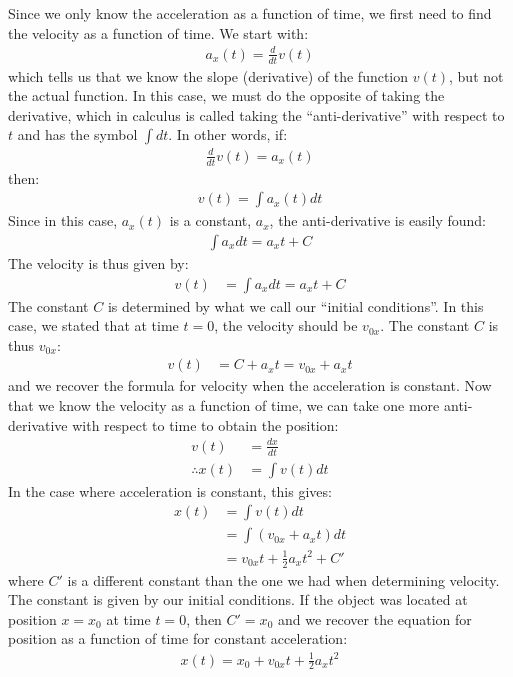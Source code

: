 Since we only know the acceleration as a function of time, we first need to find the velocity as a function of time. We start with:
\begin{align*}
a_x(t)=\frac{d}{dt} v(t)
\end{align*}
which tells us that we know the slope (derivative) of the function $v(t)$, but not the actual function. In this case, we must do the opposite of taking the derivative, which in calculus is called taking the ``anti-derivative'' with respect to $t$ and has the symbol $\int dt$. In other words, if:
\begin{align*}
\frac{d}{dt} v(t) =a_x(t)
\end{align*}
then:
\begin{align*}
v(t) =\int a_x(t) dt
\end{align*}
Since in this case, $a_x(t)$ is a constant, $a_x$, the anti-derivative is easily found:
\begin{align*}
\int a_xdt = a_xt + C
\end{align*}
The velocity is thus given by:
\begin{align*}
v(t) &=\int a_x dt =a_xt+C
\end{align*}
The constant $C$ is determined by what we call our ``initial conditions''. In this case, we stated that at time $t=0$, the velocity should be $v_{0x}$. The constant $C$ is thus $v_{0x}$:
\begin{align*}
v(t) &=C+a_x t =v_{0x}+a_xt
\end{align*}
and we recover the formula for velocity when the acceleration is constant. Now that we know the velocity as a function of time, we can take one more anti-derivative with respect to time to obtain the position:
\begin{align*}
v(t) &= \frac{dx}{dt}\\
\therefore x(t) &= \int v(t)dt 
\end{align*}
In the case where acceleration is constant, this gives:
\begin{align*}
 x(t) &= \int v(t)dt\\
 &=\int (v_{0x}+a_xt )dt\\
 &=v_{0x}t+\frac{1}{2}a_xt^2+C'
\end{align*} 
where $C'$ is a different constant than the one we had when determining velocity. The constant is given by our initial conditions. If the object was located at position $x=x_0$ at time $t=0$, then $C'=x_0$ and we recover the equation for position as a function of time for constant acceleration:
\begin{align*}
x(t)=x_0+v_{0x}t+\frac{1}{2}a_xt^2
\end{align*}

